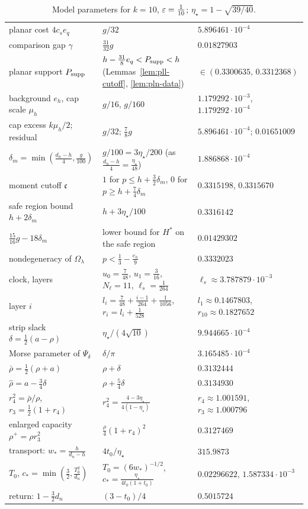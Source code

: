 \begin{table}[ht]
\begin{tabular}{@{}p{}p{}p{}@{}}
planar cost $4c_se_q$ & $g/32$ & $5.896461\cdot10^{-4}$\\
comparison gap $\gamma$ & $\frac{31}{32}g$ & $0.01827903$\\
planar support $P_{\rm supp}$ & $h-\frac{31}8e_q<P_{\rm supp}<h$ (Lemmas~\ref{lem:pll-cutoff}, \ref{lem:pln-data}) & $\in(0.3300635,\,0.3312368)$\\
\midrule
background $e_h$, cap scale $\mu_h$ & $g/16$, $g/160$ & $1.179292\cdot10^{-3}$, $1.179292\cdot10^{-4}$\\
cap excess $k\mu_h/2$; residual & $g/32$; $\frac78g$ & $5.896461\cdot10^{-4}$; $0.01651009$\\
$\delta_m=\min(\frac{d_n-h}4,\frac g{100})$ & $g/100=3\eta_\star/200$ (as $\frac{d_n-h}4=\frac{\eta_\star}{48}$) & $1.886868\cdot10^{-4}$\\
moment cutoff $\mathfrak c$ & $1$ for $p\le h+\frac32\delta_m$, $0$ for $p\ge h+\frac74\delta_m$ & $0.3315198$, $0.3315670$\\
safe region bound $h+2\delta_m$ & $h+3\eta_\star/100$ & $0.3316142$\\
$\frac{15}{16}g-18\delta_m$ & lower bound for $H^*$ on the safe region & $0.01429302$\\
nondegeneracy of $\Omega_\lambda$ & $p<\frac13-\frac{e_h}9$ & $0.3332023$\\
clock, layers & $u_0=\frac7{48}$, $u_1=\frac3{16}$, $N_\ell=11$, $\ell_s=\frac1{264}$ & $\ell_s\approx3.787879\cdot10^{-3}$\\
layer $i$ & $l_i=\frac7{48}+\frac{i-1}{264}+\frac1{1056}$, $r_i=l_i+\frac1{528}$ & $l_1\approx0.1467803$, $r_{10}\approx0.1827652$\\
\midrule
strip slack $\delta=\frac12(a-\rho)$ & $\eta_\star/(4\sqrt{10})$ & $9.944665\cdot10^{-4}$\\
Morse parameter of $\Psi_\delta$ & $\delta/\pi$ & $3.165485\cdot10^{-4}$\\
$\bar\rho=\frac12(\rho+a)$ & $\rho+\delta$ & $0.3132444$\\
$\hat\rho=a-\frac34\delta$ & $\rho+\frac54\delta$ & $0.3134930$\\
$r_4^2=\bar\rho/\rho$, $r_3=\frac12(1+r_4)$ & $r_4^2=\frac{4-3\eta_\star}{4(1-\eta_\star)}$ & $r_4\approx1.001591$, $r_3\approx1.000796$\\
enlarged capacity $\rho^+=\rho r_3^2$ & $\frac\rho4(1+r_4)^2$ & $0.3127469$\\
\midrule
transport: $w_*=\frac h{d_n-h}$ & $4t_0/\eta_\star$ & $315.9873$\\
$T_0$, $c_*=\min(\frac32,\frac{T_0^2}{d_n})$ & $T_0=(6w_*)^{-1/2}$, $c_*=\frac{\eta_\star}{4t_0(1+t_0)}$ & $0.02296622$, $1.587334\cdot10^{-3}$\\
return: $1-\frac32d_n$ & $(3-t_0)/4$ & $0.5015724$\\
\bottomrule
\end{tabular}
\caption{Model parameters for $k=10$, $\varepsilon=\frac1{10}$; $\eta_\star=1-\sqrt{39/40}$.}
\label{tab:example-model}
\end{table}

